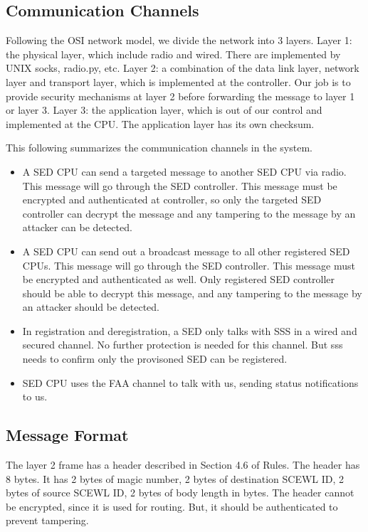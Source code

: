 \documentclass[11pt,oneside,onecolumn,letterpaper]{article}
\begin{document}
\subsection{Communication Channels}

Following the OSI network model, we divide the network into 3 layers. 
Layer 1: the physical layer, which include radio and wired. There are implemented by UNIX socks, radio.py, etc.
Layer 2: a combination of the data link layer, network layer and transport layer, which is implemented at the controller. 
Our job is to provide security mechanisms at layer 2 before forwarding the message to layer 1 or layer 3.
Layer 3: the application layer, which is out of our control and implemented at the CPU. The application layer has its own checksum.

This following summarizes the communication channels in the system.

\begin{itemize}
	\item A SED CPU can send a targeted message to another SED CPU via radio. This message will go through the SED controller. This message must be encrypted and authenticated at controller, so only the targeted SED controller can decrypt the message and any tampering to the message by an attacker can be detected. 
	
	\item A SED CPU can send out a broadcast message to all other registered SED CPUs. This message will go through the SED controller. This message must be encrypted and authenticated as well. Only registered SED controller should be able to decrypt this message, and any tampering to the message by an attacker should be detected. 
	
	\item In registration and deregistration, a SED only talks with SSS in a wired and secured channel. No further protection is needed for this channel. 
	But sss needs to confirm only the provisoned SED can be registered.
	
	\item SED CPU uses the FAA channel to talk with us, sending status notifications to us.
\end{itemize}

\subsection{Message Format}

The layer 2 frame has a header described in Section 4.6 of Rules.
The header has 8 bytes.
It has 2 bytes of magic number, 2 bytes of destination SCEWL ID, 2 bytes of source SCEWL ID, 2 bytes of body length in bytes.
The header cannot be encrypted, since it is used for routing.
But, it should be authenticated to prevent tampering.
\end{document}
